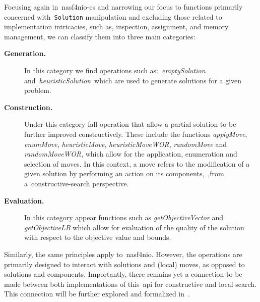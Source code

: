 Focusing again in~\acrshort{nasf4nio-cs} and narrowing our focus to functions
primarily concerned with~\texttt{Solution} manipulation and excluding those related to
implementation intricacies, such as, inspection, assignment, and memory management,
we can classify them into three main categories:

\begin{description}
      \item[\textbf{Generation.}] In this category we find operations such
            as:~\textit{emptySolution} and~\textit{heuristicSolution}~which are used to
            generate solutions for a given problem.
      \item[\textbf{Construction.}] Under this category fall operation that
            allow a partial solution to be further improved constructively.
            These include the functions \textit{applyMove}, \textit{enumMove},
            \textit{heuristicMove}, \textit{heuristicMoveWOR},
            \textit{randomMove} and \textit{randomMoveWOR}, which allow for the
            application, enumeration and selection of moves.  In this context, a
            move refers to the modification of a given solution by performing an
            action on its components,~\ie{},from
            a~\acrshort{constructive-search} perspective.
      \item[\textbf{Evaluation.}] In this category appear functions such as
            \textit{getObjectiveVector} and \textit{getObjectiveLB} which allow for
            evaluation of the quality of the solution with respect to the objective
            value and bounds.
\end{description}

Similarly, the same principles apply to~\acrshort{nasf4nio}. However, the
 operations are primarily designed to interact with
solutions and (local) moves, as opposed to solutions and components.
Importantly, there remains yet a connection to be made between both
implementations of this~\acrshort{api} for constructive and local search. This
connection will be further explored and formalized in~.